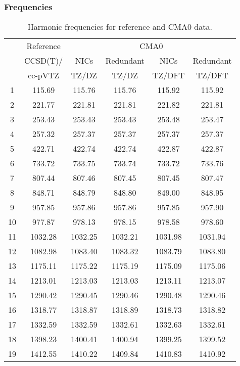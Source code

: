 \documentclass[10pt,oneside]{article}
\begin{document}
\begin{table}[h!]
\subsubsection*{Frequencies}
\centering
\caption{Harmonic frequencies for reference and CMA0 data.}
\begin{tabular}{cccccc}
\toprule
{} & Reference & \multicolumn{4}{c}{CMA0} \\
{} &  CCSD(T)/ &    NICs &  Redundant &    NICs & Redundant \\
{} &   cc-pVTZ &   TZ/DZ &      TZ/DZ &  TZ/DFT &    TZ/DFT \\
\midrule
1  &    115.69 &  115.76 &     115.76 &  115.92 &    115.92 \\
2  &    221.77 &  221.81 &     221.81 &  221.82 &    221.81 \\
3  &    253.43 &  253.43 &     253.43 &  253.48 &    253.47 \\
4  &    257.32 &  257.37 &     257.37 &  257.37 &    257.37 \\
5  &    422.71 &  422.74 &     422.74 &  422.87 &    422.87 \\
6  &    733.72 &  733.75 &     733.74 &  733.72 &    733.76 \\
7  &    807.44 &  807.46 &     807.45 &  807.45 &    807.47 \\
8  &    848.71 &  848.79 &     848.80 &  849.00 &    848.95 \\
9  &    957.85 &  957.86 &     957.86 &  957.85 &    957.90 \\
10 &    977.87 &  978.13 &     978.15 &  978.58 &    978.60 \\
11 &   1032.28 & 1032.25 &    1032.21 & 1031.98 &   1031.94 \\
12 &   1082.98 & 1083.40 &    1083.32 & 1083.79 &   1083.80 \\
13 &   1175.11 & 1175.22 &    1175.19 & 1175.09 &   1175.06 \\
14 &   1213.01 & 1213.03 &    1213.03 & 1213.11 &   1213.07 \\
15 &   1290.42 & 1290.45 &    1290.46 & 1290.48 &   1290.46 \\
16 &   1318.77 & 1318.87 &    1318.89 & 1318.73 &   1318.82 \\
17 &   1332.59 & 1332.59 &    1332.61 & 1332.63 &   1332.61 \\
18 &   1398.23 & 1400.41 &    1400.94 & 1399.25 &   1399.52 \\
19 &   1412.55 & 1410.22 &    1409.84 & 1410.83 &   1410.92 \\

\end{tabular}
\end{table}
\end{document}
